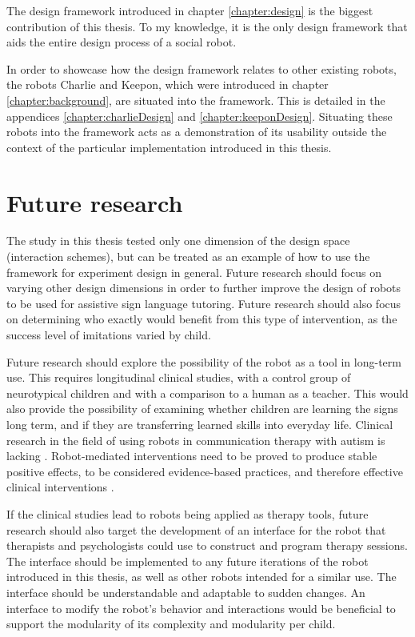 The design framework introduced in chapter \ref{chapter:design} is the biggest contribution of this thesis. To my knowledge, it is the only design framework that aids the entire design process of a social robot. 

In order to showcase how the design framework relates to other existing robots, the robots Charlie and Keepon, which were introduced in chapter \ref{chapter:background}, are situated into the framework. This is detailed in the appendices \ref{chapter:charlieDesign} and \ref{chapter:keeponDesign}. Situating these robots into the framework acts as a demonstration of its usability outside the context of the particular implementation introduced in this thesis.



\section{Future research}

The study in this thesis tested only one dimension of the design space (interaction schemes), but can be treated as an example of how to use the framework for experiment design in general. Future research should focus on varying other design dimensions in order to further improve the design of robots to be used for assistive sign language tutoring. Future research should also focus on determining who exactly would benefit from this type of intervention, as the success level of imitations varied by child.

Future research should explore the possibility of the robot as a tool in long-term use. This requires longitudinal clinical studies, with a control group of neurotypical children and with a comparison to a human as a teacher. This would also provide the possibility of examining whether children are learning the signs long term, and if they are transferring learned skills into everyday life. Clinical research in the field of using robots in communication therapy with autism is lacking \cite{Begum2016}. Robot-mediated interventions need to be proved to produce stable positive effects, to be considered evidence-based practices, and therefore effective clinical interventions \cite{Begum2016}.

If the clinical studies lead to robots being applied as therapy tools, future research should also target the development of an interface for the robot that therapists and psychologists could use to construct and program therapy sessions. The interface should be implemented to any future iterations of the robot introduced in this thesis, as well as other robots intended for a similar use. The interface should be understandable and adaptable to sudden changes. An interface to modify the robot's behavior and interactions would be beneficial to support the modularity of its complexity and modularity per child. 


